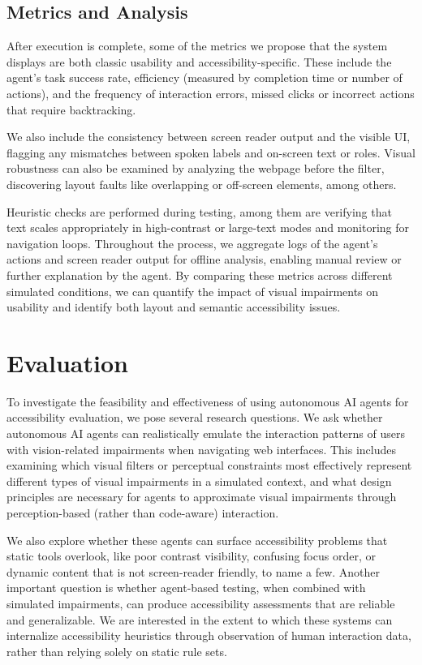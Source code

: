 \subsection{Metrics and Analysis}

After execution is complete, some of the metrics we propose that the system displays are both classic usability and accessibility-specific. These include the agent's task success rate, efficiency (measured by completion time or number of actions), and the frequency of interaction errors, missed clicks or incorrect actions that require backtracking. 

We also include the consistency between screen reader output and the visible \ac{UI}, flagging any mismatches between spoken labels and on-screen text or roles. Visual robustness can also be examined by analyzing the webpage before the filter, discovering layout faults like overlapping or off-screen elements, among others. 

Heuristic checks are performed during testing, among them are verifying that text scales appropriately in high-contrast or large-text modes and monitoring for navigation loops. Throughout the process, we aggregate logs of the agent's actions and screen reader output for offline analysis, enabling manual review or further explanation by the agent. By comparing these metrics across different simulated conditions, we can quantify the impact of visual impairments on usability and identify both layout and semantic accessibility issues.


\section{Evaluation}

To investigate the feasibility and effectiveness of using autonomous AI agents for accessibility evaluation, we pose several research questions. We ask whether autonomous AI agents can realistically emulate the interaction patterns of users with vision-related impairments when navigating web interfaces. This includes examining which visual filters or perceptual constraints most effectively represent different types of visual impairments in a simulated context, and what design principles are necessary for agents to approximate visual impairments through perception-based (rather than code-aware) interaction.

We also explore whether these agents can surface accessibility problems that static tools overlook, like poor contrast visibility, confusing focus order, or dynamic content that is not screen-reader friendly, to name a few. Another important question is whether agent-based testing, when combined with simulated impairments, can produce accessibility assessments that are reliable and generalizable. We are interested in the extent to which these systems can internalize accessibility heuristics through observation of human interaction data, rather than relying solely on static rule sets.

